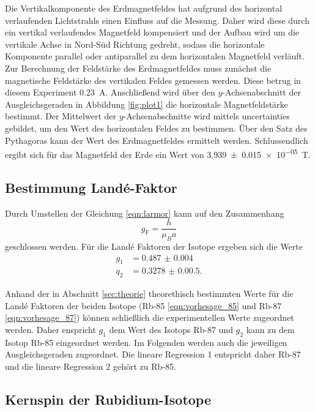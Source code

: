 Die Vertikalkomponente des Erdmagnetfeldes hat aufgrund des horizontal verlaufenden Lichtstrahls einen Einfluss auf die Messung.
Daher wird diese durch ein vertikal verlaufendes Magnetfeld kompensiert und der Aufbau wird um die vertikale Achse in Nord-Süd Richtung gedreht,
sodass die horizontale Komponente parallel oder antiparallel zu dem horizontalen Magnetfeld verläuft.
Zur Berechnung der Feldstärke des Erdmagnetfeldes muss zunächst die magnetische Feldstärke des vertikalen Feldes gemessen werden.
Diese betrug in diesem Experiment \qty{0.23}{\ampere}.
Anschließend wird über den $y$-Achsenabschnitt der Ausgleichsgeraden in Abbildung \ref{fig:plot1} die horizontale Magnetfeldstärke bestimmt.
Der Mittelwert der $y$-Achsenabschnitte wird mittels uncertainties \cite{uncertainties} gebildet, um den Wert des horizontalen Feldes zu bestimmen.
Über den Satz des Pythagoras kann der Wert des Erdmagnetfeldes ermittelt werden.
Schlussendlich ergibt sich für das Magnetfeld der Erde ein Wert von \qty{3.939(15)e-05}{\tesla}.

\subsection{Bestimmung Landé-Faktor}
\label{sec:best-lande-faktoren}

Durch Umstellen der Gleichung \ref{eqn:larmor} kann auf den Zusammenhang
\begin{equation}
    g_{\text{F}} = \frac{h}{\mu_B a }
\end{equation}
geschlossen werden.
Für die Landé Faktoren der Isotope ergeben sich die Werte
\begin{align}
    g_1 &= \qty{0.487(4)} \\
    q_2 &= \qty{0.3278(0.5)} .
\end{align}

Anhand der in Abschnitt \ref{sec:theorie} theorethisch bestimmten Werte für die Landé Faktoren der beiden Isotope (Rb-85 \ref{eqn:vorhesage_85} und Rb-87 \ref{eqn:vorhesage_87}) können schließlich
die experimentellen Werte zugeordnet werden.
Daher enspricht $g_1$ dem Wert des Isotops Rb-87 und $g_2$ kann zu dem Isotop Rb-85 eingeordnet werden.
Im Folgenden werden auch die jeweiligen Ausgleichsgeraden zugeordnet.
Die lineare Regression 1 entspricht daher Rb-87 und die lineare Regression 2 gehört zu Rb-85.

\subsection{Kernspin der Rubidium-Isotope}
\label{sec:Kernspin der Rubidium-Isotope}


